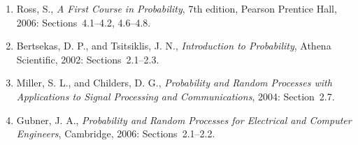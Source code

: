\begin{small}
\begin{enumerate}
\item Ross, S., \emph{A First Course in Probability}, 7th edition, Pearson Prentice Hall, 2006: Sections~4.1--4.2, 4.6--4.8.
\item Bertsekas, D. P., and Tsitsiklis, J. N., \emph{Introduction to Probability}, Athena Scientific, 2002: Sections~2.1--2.3.
\item Miller, S. L., and Childers, D. G., \emph{Probability and Random Processes with Applications to Signal Processing and Communications}, 2004: Section~2.7.
\item Gubner, J. A., \emph{Probability and Random Processes for Electrical and Computer Engineers}, Cambridge, 2006: Sections~2.1--2.2.
\end{enumerate}
\end{small}

